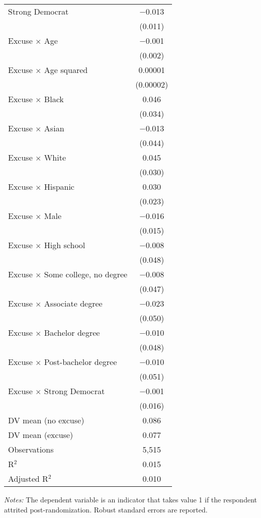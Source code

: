 \begin{center}
\begin{ThreePartTable}
\begin{longtable}{lc}
 \addlinespace 
 Strong Democrat & $-$0.013 \\ 
  & (0.011) \\ 
 \addlinespace 
 Excuse $\times$ Age & $-$0.001 \\ 
  & (0.002) \\ 
 \addlinespace 
 Excuse $\times$ Age squared & 0.00001 \\ 
  & (0.00002) \\ 
 \addlinespace 
 Excuse $\times$ Black & 0.046 \\ 
  & (0.034) \\ 
 \addlinespace 
 Excuse $\times$ Asian & $-$0.013 \\ 
  & (0.044) \\ 
 \addlinespace 
 Excuse $\times$ White & 0.045 \\ 
  & (0.030) \\ 
 \addlinespace 
 Excuse $\times$ Hispanic & 0.030 \\ 
  & (0.023) \\ 
 \addlinespace 
 Excuse $\times$ Male & $-$0.016 \\ 
  & (0.015) \\ 
 \addlinespace 
 Excuse $\times$ High school & $-$0.008 \\ 
  & (0.048) \\ 
 \addlinespace 
 Excuse $\times$ Some college, no degree & $-$0.008 \\ 
  & (0.047) \\ 
 \addlinespace 
 Excuse $\times$ Associate degree & $-$0.023 \\ 
  & (0.050) \\ 
 \addlinespace 
 Excuse $\times$ Bachelor degree & $-$0.010 \\ 
  & (0.048) \\ 
 \addlinespace 
 Excuse $\times$ Post-bachelor degree & $-$0.010 \\ 
  & (0.051) \\ 
 \addlinespace 
 Excuse $\times$ Strong Democrat & $-$0.001 \\ 
  & (0.016) \\ 
 \addlinespace 
\midrule  
DV mean (no excuse) & 0.086 \\
DV mean (excuse) & 0.077 \\
Observations & 5,515 \\ 
R$^{2}$ & 0.015 \\ 
Adjusted R$^{2}$ & 0.010 \\ 
\bottomrule 
\end{longtable}
\end{ThreePartTable}
\end{center}
\footnotesize
\insertTableNotes
\textit{Notes: }The dependent variable is an indicator that takes value 1 if the respondent attrited post-randomization. Robust standard errors are reported.

